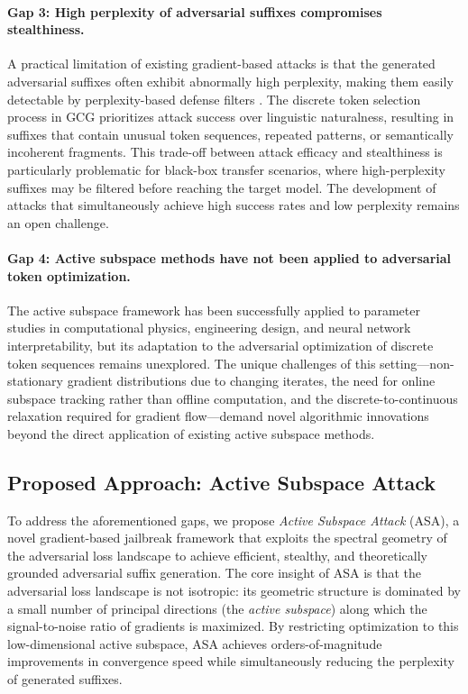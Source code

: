 ﻿\documentclass[lettersize,journal]{IEEEtran}
\begin{document}
\paragraph{Gap 3: High perplexity of adversarial suffixes compromises stealthiness.} A practical limitation of existing gradient-based attacks is that the generated adversarial suffixes often exhibit abnormally high perplexity, making them easily detectable by perplexity-based defense filters \cite{zhu2023autodan, robey2023smoothllm}. The discrete token selection process in GCG prioritizes attack success over linguistic naturalness, resulting in suffixes that contain unusual token sequences, repeated patterns, or semantically incoherent fragments. This trade-off between attack efficacy and stealthiness is particularly problematic for black-box transfer scenarios, where high-perplexity suffixes may be filtered before reaching the target model. The development of attacks that simultaneously achieve high success rates and low perplexity remains an open challenge.

\paragraph{Gap 4: Active subspace methods have not been applied to adversarial token optimization.} The active subspace framework \cite{constantine2014active, constantine2015active} has been successfully applied to parameter studies in computational physics, engineering design, and neural network interpretability, but its adaptation to the adversarial optimization of discrete token sequences remains unexplored. The unique challenges of this setting---non-stationary gradient distributions due to changing iterates, the need for online subspace tracking rather than offline computation, and the discrete-to-continuous relaxation required for gradient flow---demand novel algorithmic innovations beyond the direct application of existing active subspace methods.

\subsection{Proposed Approach: Active Subspace Attack}
\label{sec:proposed_approach}

To address the aforementioned gaps, we propose \textit{Active Subspace Attack} (ASA), a novel gradient-based jailbreak framework that exploits the spectral geometry of the adversarial loss landscape to achieve efficient, stealthy, and theoretically grounded adversarial suffix generation. The core insight of ASA is that the adversarial loss landscape is not isotropic: its geometric structure is dominated by a small number of principal directions (the \textit{active subspace}) along which the signal-to-noise ratio of gradients is maximized. By restricting optimization to this low-dimensional active subspace, ASA achieves orders-of-magnitude improvements in convergence speed while simultaneously reducing the perplexity of generated suffixes.
\end{document}
